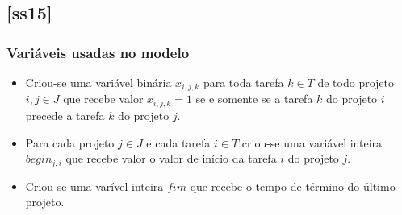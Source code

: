 \documentclass[11pt,letterpaper]{article}
\begin{document}
\subsection{{[}ss15{]}}
\subsubsection*{Variáveis usadas no modelo}
\begin{itemize}
\item Criou-se uma variável binária $x_{i,j,k}$ para toda tarefa $k \in T$ de todo projeto $i, j  \in J$ que recebe valor $x_{i,j,k}=1$ se e somente se a tarefa $k$ do projeto $i$ precede a tarefa $k$ do projeto $j$.

\item Para cada projeto $j \in J$ e cada tarefa $i \in T$ criou-se uma variável inteira $begin_{j,i}$
  que recebe valor o valor de início da tarefa $i$ do projeto $j$.

\item Criou-se uma varível inteira $fim$ que recebe o tempo de término
  do último projeto.

\end{itemize}
\end{document}
